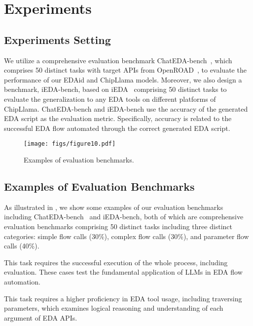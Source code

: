 \section{Experiments}
\label{sec:exp}

\subsection{Experiments Setting}
We utilize a comprehensive evaluation benchmark ChatEDA-bench~\cite{wu2024chateda}, which comprises 50 distinct tasks with target APIs from OpenROAD~\cite{ajayi2019openroad}, to evaluate the performance of our EDAid and ChipLlama models.
Moreover, we also design a benchmark, iEDA-bench, based on iEDA~\cite{li2024ieda} comprising 50 distinct tasks to evaluate the generalization to any EDA tools on different platforms of ChipLlama.
ChatEDA-bench and iEDA-bench use the accuracy of the generated EDA script as the evaluation metric.
Specifically, accuracy is related to the successful EDA flow automated through the correct generated EDA script.

\begin{figure}[!tb]
    \centering
    \texttt{[image: figs/figure10.pdf]} 
    \caption{Examples of evaluation benchmarks. 
    } 
    \label{fig:exp_bench}
\end{figure}

\subsection{Examples of Evaluation Benchmarks}
\label{sec:eval}
As illustrated in , we show some examples of our evaluation benchmarks including ChatEDA-bench~\cite{wu2024chateda} and iEDA-bench, both of which are comprehensive evaluation benchmarks comprising 50 distinct tasks including three distinct categories: simple flow calls (30\%), complex flow calls (30\%), and parameter flow calls (40\%). 

This task requires the successful execution of the whole process, including evaluation.
These cases test the fundamental application of LLMs in EDA flow automation. 

This task requires a higher proficiency in EDA tool usage, including traversing parameters, which examines logical reasoning and understanding of each argument of EDA APIs.

